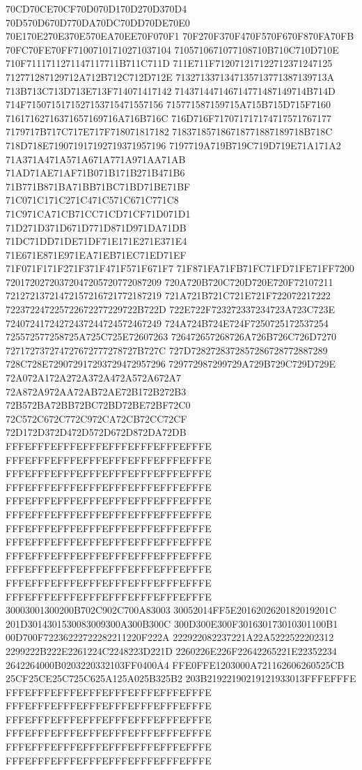 70CD70CE70CF70D070D170D270D370D4
70D570D670D770DA70DC70DD70DE70E0
70E170E270E370E570EA70EE70F070F1
70F270F370F470F570F670F870FA70FB
70FC70FE70FF71007101710271037104
7105710671077108710B710C710D710E
710F7111711271147117711B711C711D
711E711F712071217122712371247125
712771287129712A712B712C712D712E
7132713371347135713771387139713A
713B713C713D713E713F714071417142
714371447146714771487149714B714D
714F7150715171527153715471557156
715771587159715A715B715D715F7160
71617162716371657169716A716B716C
716D716F717071717174717571767177
7179717B717C717E717F718071817182
718371857186718771887189718B718C
718D718E719071917192719371957196
7197719A719B719C719D719E71A171A2
71A371A471A571A671A771A971AA71AB
71AD71AE71AF71B071B171B271B471B6
71B771B871BA71BB71BC71BD71BE71BF
71C071C171C271C471C571C671C771C8
71C971CA71CB71CC71CD71CF71D071D1
71D271D371D671D771D871D971DA71DB
71DC71DD71DE71DF71E171E271E371E4
71E671E871E971EA71EB71EC71ED71EF
71F071F171F271F371F471F571F671F7
71F871FA71FB71FC71FD71FE71FF7200
72017202720372047205720772087209
720A720B720C720D720E720F72107211
72127213721472157216721772187219
721A721B721C721E721F722072217222
722372247225722672277229722B722D
722E722F723272337234723A723C723E
72407241724272437244724572467249
724A724B724E724F7250725172537254
725572577258725A725C725E72607263
726472657268726A726B726C726D7270
727172737274727672777278727B727C
727D7282728372857286728772887289
728C728E729072917293729472957296
729772987299729A729B729C729D729E
72A072A172A272A372A472A572A672A7
72A872A972AA72AB72AE72B172B272B3
72B572BA72BB72BC72BD72BE72BF72C0
72C572C672C772C972CA72CB72CC72CF
72D172D372D472D572D672D872DA72DB
FFFEFFFEFFFEFFFEFFFEFFFEFFFEFFFE
FFFEFFFEFFFEFFFEFFFEFFFEFFFEFFFE
FFFEFFFEFFFEFFFEFFFEFFFEFFFEFFFE
FFFEFFFEFFFEFFFEFFFEFFFEFFFEFFFE
FFFEFFFEFFFEFFFEFFFEFFFEFFFEFFFE
FFFEFFFEFFFEFFFEFFFEFFFEFFFEFFFE
FFFEFFFEFFFEFFFEFFFEFFFEFFFEFFFE
FFFEFFFEFFFEFFFEFFFEFFFEFFFEFFFE
FFFEFFFEFFFEFFFEFFFEFFFEFFFEFFFE
FFFEFFFEFFFEFFFEFFFEFFFEFFFEFFFE
FFFEFFFEFFFEFFFEFFFEFFFEFFFEFFFE
FFFEFFFEFFFEFFFEFFFEFFFEFFFEFFFE
30003001300200B702C902C700A83003
30052014FF5E2016202620182019201C
201D3014301530083009300A300B300C
300D300E300F301630173010301100B1
00D700F72236222722282211220F222A
222922082237221A22A5222522202312
2299222B222E2261224C2248223D221D
2260226E226F22642265221E22352234
2642264000B0203220332103FF0400A4
FFE0FFE1203000A721162606260525CB
25CF25CE25C725C625A125A025B325B2
203B21922190219121933013FFFEFFFE
FFFEFFFEFFFEFFFEFFFEFFFEFFFEFFFE
FFFEFFFEFFFEFFFEFFFEFFFEFFFEFFFE
FFFEFFFEFFFEFFFEFFFEFFFEFFFEFFFE
FFFEFFFEFFFEFFFEFFFEFFFEFFFEFFFE
FFFEFFFEFFFEFFFEFFFEFFFEFFFEFFFE
FFFEFFFEFFFEFFFEFFFEFFFEFFFEFFFE
